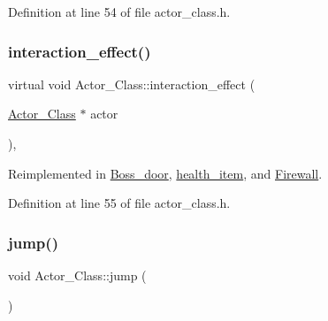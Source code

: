 Definition at line 54 of file actor\+\_\+class.\+h.

\hypertarget{class_actor___class_af3488ca470eb77255060142fd167aa72}{}\label{class_actor___class_af3488ca470eb77255060142fd167aa72} 
\subsubsection{\texorpdfstring{interaction\+\_\+effect()}{interaction\_effect()}}
{\footnotesize\ttfamily virtual void Actor\+\_\+\+Class\+::interaction\+\_\+effect (\begin{DoxyParamCaption}\item[{\hyperlink{class_actor___class}{Actor\+\_\+\+Class} $\ast$}]{actor }\end{DoxyParamCaption})\hspace{0.3cm}{\ttfamily [inline]}, {\ttfamily [virtual]}}



Reimplemented in \hyperlink{class_boss__door_ab47df13fb29b88a5be09fb7062384a50}{Boss\+\_\+door}, \hyperlink{classhealth__item_a97005bdbe125d68fb6cd5561081674e2}{health\+\_\+item}, and \hyperlink{class_firewall_a035dac1c484fe153ca14710777c617cb}{Firewall}.



Definition at line 55 of file actor\+\_\+class.\+h.

\hypertarget{class_actor___class_ab33216a3ce0c856bdc16231c71ae35c2}{}\label{class_actor___class_ab33216a3ce0c856bdc16231c71ae35c2} 
\subsubsection{\texorpdfstring{jump()}{jump()}}
{\footnotesize\ttfamily void Actor\+\_\+\+Class\+::jump (\begin{DoxyParamCaption}{ }\end{DoxyParamCaption})\hspace{0.3cm}{\ttfamily [virtual]}}



